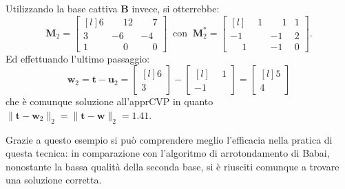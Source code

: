 \begin{exmp}
Utilizzando la base cattiva $\mathbf{B}$ invece, si otterrebbe:
\begin{equation*}
    \mathbf{M}_2 =
    \begin{bmatrix*}[l]
        6 & \phantom{-}12 & \phantom{-}7\\
        3 & -6           & -4\\
        1 & \phantom{-}0 & \phantom{-}0
    \end{bmatrix*}
    \ \text{ con } \
    \mathbf{M}_2^* =
    \begin{bmatrix*}[l]
        \phantom{-}1 & \phantom{-}1 & 1\\
        -1           & -1           & 2\\
        \phantom{-}1 & -1           & 0
    \end{bmatrix*}.
\end{equation*}
Ed effettuando l'ultimo passaggio:
\begin{equation*}
    \mathbf{w}_2 = \mathbf{t} - \mathbf{u}_2 =
    \begin{bmatrix*}[l]
        6 \\
        3
    \end{bmatrix*}
    -
    \begin{bmatrix*}[l]
        \phantom{-}1 \\
        -1
    \end{bmatrix*}
    =
    \begin{bmatrix*}[l]
        5 \\
        4
    \end{bmatrix*}
\end{equation*}
che è comunque soluzione all'apprCVP in quanto 
$\|\mathbf{t}-\mathbf{w}_2\|_2=\|\mathbf{t}-\mathbf{w}\|_2=1.41$.
\end{exmp}
Grazie a questo esempio si può comprendere meglio l'efficacia nella pratica di questa tecnica:
in comparazione con l'algoritmo di arrotondamento di Babai, nonostante la bassa qualità
della seconda base, si è riusciti comunque a trovare una soluzione corretta.


